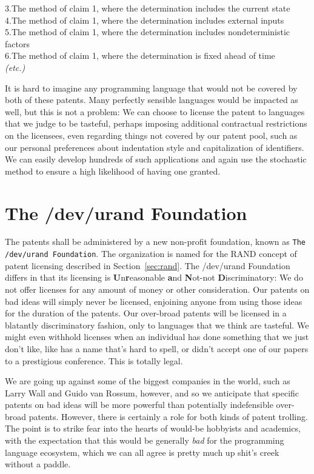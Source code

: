 \documentclass[acmtocl]%
{boviktrans}
\begin{document}
3.\quad The method of claim 1, where the determination includes the current state \\

4.\quad The method of claim 1, where the determination includes external inputs \\

5.\quad The method of claim 1, where the determination includes nondeterministic factors \\

6.\quad The method of claim 1, where the determination is fixed ahead of time \\

{\it (etc.)}

It is hard to imagine any programming language that would not be
covered by both of these patents. Many perfectly sensible languages
would be impacted as well, but this is not a problem: We can choose to
license the patent to languages that we judge to be tasteful, perhaps
imposing additional contractual restrictions on the licensees, even
regarding things not covered by our patent pool, such as our personal
preferences about indentation style and capitalization of
identifiers. We can easily develop hundreds of such applications and
again use the stochastic method to ensure a high likelihood of having
one granted.

\section{The /dev/urand Foundation}

The patents shall be administered by a new non-profit foundation,
known as {\tt The /dev/urand Foundation}. The organization is named for the
RAND concept of patent licensing described in Section~\ref{sec:rand}. 
The /dev/urand Foundation differs in that its licensing is {\bf
  U}n{\bf r}easonable {\bf a}nd {\bf N}ot-not {\bf D}iscriminatory: We
do not offer licenses for any amount of money or other consideration.
Our patents on bad ideas will simply never be licensed, enjoining
anyone from using those ideas for the duration of the patents. 
Our over-broad patents will be licensed
in a blatantly discriminatory fashion, only to languages that we think
are tasteful. 
We might even withhold licenses when an individual has
done something that we just don't like, like has a name that's hard to
spell, or didn't accept one of our papers to a prestigious
conference. This is totally legal.

We are going up against some of the biggest companies in the world,
such as Larry Wall and Guido van Rossum, however, and so we anticipate
that specific patents on bad ideas will be more powerful than 
potentially indefensible over-broad patents. However, there is certainly
a role for both kinds of patent trolling.
The point is to strike fear into the hearts of would-be hobbyists and
academics, with the expectation that this would be generally {\it bad}
for the programming language ecosystem, which we can all agree is
pretty much up shit's creek without a paddle.
\end{document}
